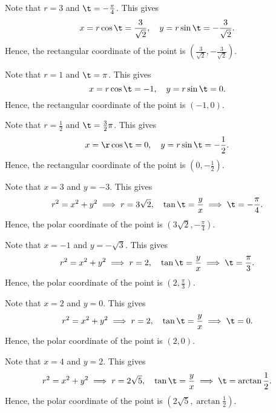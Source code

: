 \begin{solution}
    \begin{ppart}
        \begin{psubpart}
            Note that $r = 3$ and $\t = -\frac\pi4$. This gives \[x = r\cos\t = \frac{3}{\sqrt2}, \quad y = r\sin\t = -\frac{3}{\sqrt2}.\] Hence, the rectangular coordinate of the point is $(\frac{3}{\sqrt2}, -\frac{3}{\sqrt2})$.
        \end{psubpart}
        \begin{psubpart}
            Note that $r = 1$ and $\t = \pi$. This gives \[x = r\cos\t = -1, \quad y = r\sin\t = 0.\] Hence, the rectangular coordinate of the point is $(-1, 0)$.
        \end{psubpart}
        \begin{psubpart}
            Note that $r =\frac12$ and $\t = \frac32 \pi$. This gives \[x = \r\cos\t = 0, \quad y = r\sin\t = -\frac12.\] Hence, the rectangular coordinate of the point is $(0, -\frac12)$.
        \end{psubpart}
    \end{ppart}
    \begin{ppart}
        \begin{psubpart}
            Note that $x = 3$ and $y = -3$. This gives \[r^2 = x^2 + y^2 \implies r = 3\sqrt2, \quad \tan \t = \frac{y}{x} \implies \t = -\frac\pi4.\] Hence, the polar coordinate of the point is $(3\sqrt2, -\frac\pi4)$.
        \end{psubpart}
        \begin{psubpart}
            Note that $x = -1$ and $y = -\sqrt3$. This gives \[r^2 = x^2 + y^2 \implies r = 2, \quad \tan \t = \frac{y}{x} \implies \t = \frac\pi3.\] Hence, the polar coordinate of the point is $(2, \frac\pi3)$.
        \end{psubpart}
        \begin{psubpart}
            Note that $x = 2$ and $y = 0$. This gives \[r^2 = x^2 + y^2 \implies r = 2, \quad \tan \t = \frac{y}{x} \implies \t = 0.\] Hence, the polar coordinate of the point is $(2, 0)$.
        \end{psubpart}
        \begin{psubpart}
            Note that $x = 4$ and $y = 2$. This gives \[r^2 = x^2 + y^2 \implies r = 2\sqrt5, \quad \tan \t = \frac{y}{x} \implies \t = \arctan \frac12.\] Hence, the polar coordinate of the point is $(2\sqrt5, \arctan \frac12)$.
        \end{psubpart}
    \end{ppart}
\end{solution}

